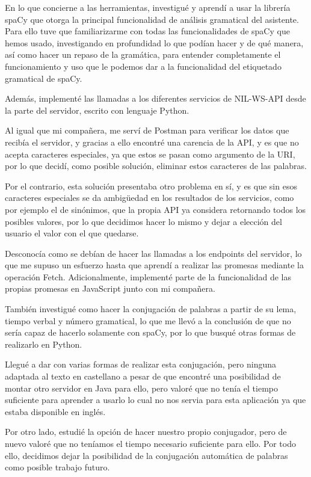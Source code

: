 En lo que concierne a las herramientas, investigué y aprendí a usar la librería spaCy que otorga la principal funcionalidad de análisis gramatical del asistente. Para ello tuve que familiarizarme con todas las funcionalidades de spaCy que hemos usado, investigando en profundidad lo que podían hacer y de qué manera, así como hacer un repaso de la gramática, para entender completamente el funcionamiento y uso que le podemos dar a la funcionalidad del etiquetado gramatical de spaCy.


Además, implementé las llamadas a los diferentes servicios de NIL-WS-API desde la parte del servidor, escrito con lenguaje Python.

Al igual que mi compañera, me serví de Postman para verificar los datos que recibía el servidor, y gracias a ello encontré una carencia de la API, y es que no acepta caracteres especiales, ya que estos se pasan como argumento de la URI, por lo que decidí, como posible solución, eliminar estos caracteres de las palabras.

 Por el contrario, esta solución presentaba otro problema en sí, y es que sin esos caracteres especiales se da ambigüedad en los resultados de los servicios, como por ejemplo el de sinónimos, que la propia API ya considera retornando todos los posibles valores, por lo que decidimos hacer lo mismo y dejar a elección del usuario el valor con el que quedarse.

Desconocía como se debían de hacer las llamadas a los endpoints del servidor, lo que me supuso un esfuerzo hasta que aprendí a realizar las promesas mediante la operación Fetch. Adicionalmente, implementé parte de la funcionalidad de las propias promesas en JavaScript junto con mi compañera.

También investigué como hacer la conjugación de palabras a partir de su lema, tiempo verbal y número gramatical, lo que me llevó a la conclusión de que no sería capaz de hacerlo solamente con spaCy, por lo que busqué otras formas de realizarlo en Python. 

Llegué a dar con varias formas de realizar esta conjugación, pero ninguna adaptada al texto en castellano a pesar de que encontré una posibilidad de montar otro servidor en Java para ello, pero valoré que no tenía el tiempo suficiente para aprender a usarlo lo cual no nos servia para esta aplicación ya que estaba disponible en inglés. 

Por otro lado, estudié la opción de hacer nuestro propio conjugador, pero de nuevo valoré que no teníamos el tiempo necesario suficiente para ello. Por todo ello, decidimos dejar la posibilidad de la conjugación automática de palabras como posible trabajo futuro. 


